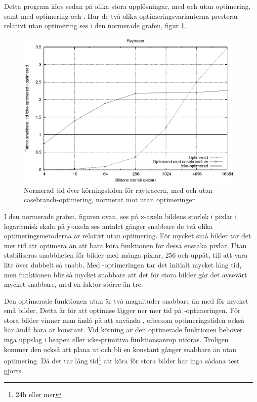 \documentclass[Rapport]{subfiles}
\begin{document}
Detta program körs sedan på olika stora upplösningar, med och utan optimering,
samt med optimering och . Hur de två olika
optimeringsvarianterna presterar relativt utan optimering ses i 
den normerade grafen, figur \ref{fig:Resultat:shapes:normgraf}.

\begin{figure}[H]
\includegraphics{shapesnorm.eps}
\caption{Normerad tid över körningstiden för raytracern, med och utan
casebranch-optimering, normerat mot utan optimeringen}
\label{fig:Resultat:shapes:normgraf}
\end{figure}

I den normerade grafen, figuren ovan, ses
på x-axeln bildens storlek i pixlar i logaritmisk skala
på y-axeln ses antalet gånger snabbare de två olika optimeringsmetoderna är relativt
utan optimering. 
För mycket små bilder tar det mer tid att optimera än att bara köra
funktionen för dessa enstaka pixlar. Utan  stabiliseras
snabbheten för bilder med många pixlar, 256 och uppåt, till att vara lite över dubbelt
så snabb.
Med -optimeringen tar det initialt mycket lång tid, men funktionen blir
så mycket snabbare att det för stora bilder går det avsevärt mycket snabbare, med 
en faktor större än tre.

Den optimerade funktionen utan  är två magnituder snabbare
än med  för mycket små bilder. Detta är för att optimise
lägger ner mer tid på -optimeringen.
För stora bilder vinner man ändå på att använda , eftersom optimeringstiden
också här ändå bara är konstant. Vid körning av den optimerade funktionen
behöver inga uppslag i heapen eller icke-primitiva funktionsanrop utföras. 
Troligen kommer den också att plana
ut och bli en konstant gånger snabbare än utan optimering. Då det tar
lång tid\footnote{ 24h eller mer} att köra för stora bilder
har inga sådana test gjorts.
\end{document}
